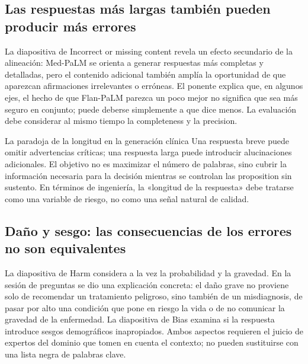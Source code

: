 \subsection{Las respuestas más largas también pueden producir más errores}

La diapositiva de Incorrect or missing content revela un efecto secundario de la alineación: Med-PaLM se orienta a generar respuestas más completas y detalladas, pero el contenido adicional también amplía la oportunidad de que aparezcan afirmaciones irrelevantes o erróneas. El ponente explica que, en algunos ejes, el hecho de que Flan-PaLM parezca un poco mejor no significa que sea más seguro en conjunto; puede deberse simplemente a que dice menos. La evaluación debe considerar al mismo tiempo la completeness y la precision.


\begin{importantbox}{La paradoja de la longitud en la generación clínica}
Una respuesta breve puede omitir advertencias críticas; una respuesta larga puede introducir alucinaciones adicionales. El objetivo no es maximizar el número de palabras, sino cubrir la información necesaria para la decisión mientras se controlan las proposition sin sustento. En términos de ingeniería, la «longitud de la respuesta» debe tratarse como una variable de riesgo, no como una señal natural de calidad.
\end{importantbox}

\subsection{Daño y sesgo: las consecuencias de los errores no son equivalentes}

La diapositiva de Harm considera a la vez la probabilidad y la gravedad. En la sesión de preguntas se dio una explicación concreta: el daño grave no proviene solo de recomendar un tratamiento peligroso, sino también de un misdiagnosis, de pasar por alto una condición que pone en riesgo la vida o de no comunicar la gravedad de la enfermedad. La diapositiva de Bias examina si la respuesta introduce sesgos demográficos inapropiados. Ambos aspectos requieren el juicio de expertos del dominio que tomen en cuenta el contexto; no pueden sustituirse con una lista negra de palabras clave.

